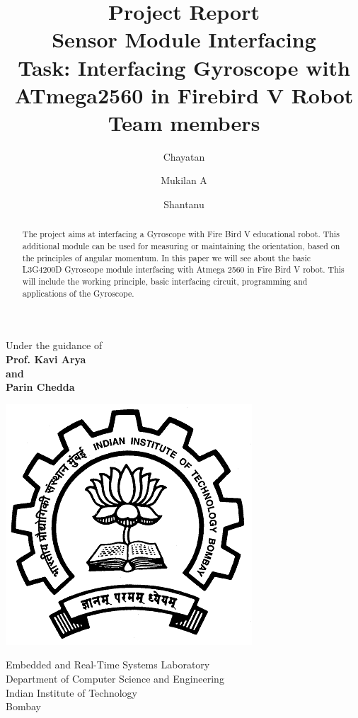 \documentclass[a4paper,12 pt]{article}
\title {Project Report \\ Sensor Module Interfacing \\[10pt] Task: Interfacing Gyroscope with ATmega2560 in Firebird V Robot \\[25pt] Team members }
\author {Chayatan \and Mukilan A \and Shantanu}
\begin{document}
\maketitle
\begin{center}
\begin{large}
Under the guidance of\\
\textbf{Prof. Kavi Arya\\and\\Parin Chedda}\\
\vspace{0.5in}
\end{large}
\end{center}
\begin{center}
\includegraphics[scale=0.32]{iitb.png}
\end{center}
\begin{center}
\begin{large}
Embedded and Real-Time Systems Laboratory \\
Department of Computer Science and Engineering \\
Indian Institute of Technology \\
Bombay \\
\end{large}
\end{center}

\newpage
\tableofcontents
\newpage
\begin{abstract}The project aims at interfacing a Gyroscope with Fire Bird V educational robot. This additional module can be used for measuring or maintaining the orientation, based on the principles of angular momentum. In this paper we will see about the basic L3G4200D Gyroscope module interfacing with Atmega 2560 in Fire Bird V robot. This will include the working principle, basic interfacing circuit, programming and applications of the Gyroscope.
\end{abstract}
\end{document}
